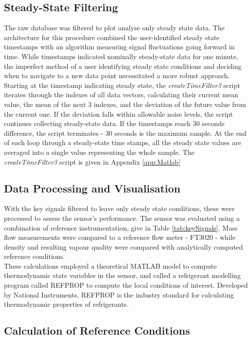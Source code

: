 \documentclass{report}
\begin{document}
\subsection{Steady-State Filtering}
The raw database was filtered to plot analyse only steady state data. The architecture for this procedure combined the user-identified steady state timestamps with an algorithm measuring signal fluctuations going forward in time. While timestamps indicated nominally steady-state data for one minute, the imperfect method of a user identifying steady state conditions and deciding when to navigate to a new data point necessitated a more robust approach. \\Starting at the timestamp indicating steady state, the \textit{createTimeFilter3} script iterates through the indexes of all data vectors, calculating their current mean value, the mean of the next 3 indexes, and the deviation of the future value from the current one. If the deviation falls within allowable noise levels, the script continues collecting steady-state data. If the timestamps reach 30 seconds difference, the script terminates - 30 seconds is the maximum sample. At the end of each loop through a steady-state time stamps, all the steady state values are averaged into a single value representing the whole sample. The \textit{createTimeFilter3} script is given in Appendix \ref{app:Matlab} 
\subsection{Data Processing and Visualisation}
With the key signals filtered to leave only steady state conditions, these were processed to assess the sensor's performance. The sensor was evaluated using a combination of reference instrumentation, give in Table \ref{tab:keySignals}. Mass flow measurements were compared to a reference flow meter - FT3020 - while density and resulting vapour quality were compared with analytically computed reference conditions.\\
These calculations employed a theoretical MATLAB model to compute thermodynamic state variables in the sensor, and called a refrigerant modelling program called REFPROP to compute the local conditions of interest. 
Developed by National Instruments, REFPROP is the industry standard for calculating thermodynamic properties of refrigerants. \cite{REFPROP}
\subsection{Calculation of Reference Conditions}
\FloatBarrier
\end{document}
